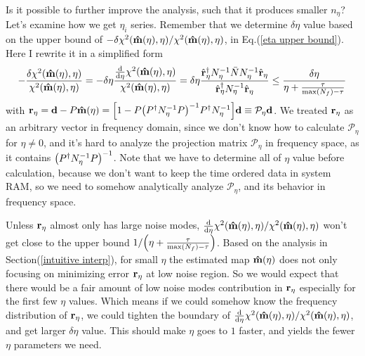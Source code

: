 \documentclass[11pt, letterpaper]{article}
\newcommand{\vbd}{\vb{d}}
\newcommand{\inv}[1]{#1^{-1}}
\newcommand{\hatm}{\vb{\hat{m}}}
\newcommand{\Pdagger}{P^{\dagger}}
\newcommand{\Nbar}{\bar{N}}
\newcommand{\PPinv}[1]{\inv{\qty(\Pdagger #1 P)}}
\begin{document}
Is it possible to further improve the analysis, such that it produces
smaller $n_{\eta}$?
Let's examine how we get $\eta_i$ series.
Remember that we determine $\delta\eta$ value based on the upper bound of 
$-\delta\chi^2(\hatm(\eta), \eta)/\chi^2(\hatm(\eta), \eta)$, in
Eq.(\ref{eta upper bound}).
Here I rewrite it in a simplified form
\begin{align}
-\frac{\delta\chi^2(\hatm(\eta), \eta)}{\chi^2(\hatm(\eta), \eta)}
= -\delta\eta
    \frac{\dv{\eta} \chi^2(\hatm(\eta), \eta)}
    {\chi^2(\hatm(\eta), \eta)}
= \delta\eta \frac{\hat{\vb{r}}_{\eta}^{\dagger} \inv{N}_{\eta} \Nbar 
    \inv{N}_{\eta} \hat{\vb{r}}_{\eta} }
    {\hat{\vb{r}}_{\eta}^{\dagger} \inv{N}_{\eta} \hat{\vb{r}}_{\eta} }
\leq  \frac{\delta \eta}{\eta + \frac{\tau}{\max(N_f) -\tau}}
\end{align}
with
$\vb{r}_{\eta} = \vbd - P\hatm(\eta) 
= \qty[ 1 - P\PPinv{\inv{N_{\eta}}}\Pdagger \inv{N_{\eta}}]\vbd
\equiv \mathcal{P}_{\eta} \vbd$.
We treated $\vb{r}_{\eta}$ as an arbitrary 
vector in frequency domain, since we don't know how to calculate 
$\mathcal{P}_{\eta}$ for $\eta \neq 0$, and it's hard to 
analyze the projection matrix $\mathcal{P}_{\eta}$ in frequency space,
as it contains $\PPinv{\inv{N_{\eta}}}$.
Note that we have to determine all of $\eta$ value before calculation, 
because we don't want to keep the time ordered data in system RAM,
so we need to somehow analytically analyze $\mathcal{P}_{\eta}$, and its behavior
in frequency space.

Unless $\vb{r}_{\eta}$ almost only has large noise modes,
$\dv{\eta}\chi^2(\hatm(\eta),\eta)/\chi^2(\hatm(\eta),\eta)$
won't get close to the upper bound
$1/\qty(\eta + \frac{\tau}{\max(N_f) -\tau})$.
Based on the analysis in Section(\ref{intuitive interp}),
for small $\eta$ the estimated map $\hatm(\eta)$ does not only focusing on 
minimizing error $\vb{r}_{\eta}$ at low noise region.
So we would expect that there would be a fair amount of low noise modes
contribution in $\vb{r}_{\eta}$ especially for the first few $\eta$ values.
Which means if we could somehow know the frequency distribution of 
$\vb{r}_{\eta}$, we could tighten the boundary of
$\dv{\eta}\chi^2(\hatm(\eta),\eta)/\chi^2(\hatm(\eta),\eta)$,
and get larger $\delta\eta$ value.
This should make $\eta$ goes to $1$ faster, and yields the fewer $\eta$ parameters 
we need.
\end{document}

